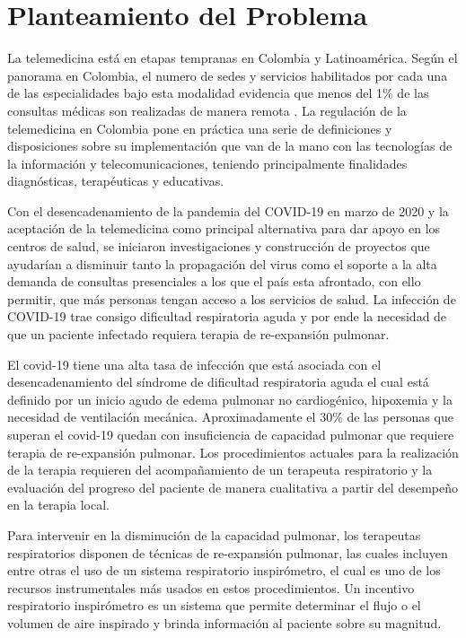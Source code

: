 
\section{Planteamiento del Problema}

La telemedicina est\'a en etapas tempranas en Colombia y Latinoam\'erica. Seg\'un el panorama en Colombia, el numero de sedes y servicios habilitados por cada una de las especialidades bajo esta modalidad evidencia que menos del 1\% de las consultas m\'edicas son realizadas de manera remota \cite{1}. La regulaci\'on de la telemedicina en Colombia pone en pr\'actica  una serie de definiciones y disposiciones sobre su implementaci\'on que van de la mano con las tecnolog\'ias de la informaci\'on y telecomunicaciones, teniendo principalmente finalidades diagn\'osticas, terap\'euticas y educativas\cite{2}.

Con el desencadenamiento de la pandemia del COVID-19 en marzo de 2020 y la aceptaci\'on de la telemedicina como principal alternativa para dar apoyo en los centros de salud, se iniciaron investigaciones y construcci\'on de proyectos que ayudar\'ian a disminuir tanto la propagaci\'on del virus como el soporte a la alta demanda de consultas presenciales a los que el pa\'is esta afrontado, con ello permitir, que m\'as personas tengan acceso a los servicios de salud. La infecci\'on de COVID-19 trae consigo dificultad respiratoria aguda y por ende la necesidad de que un paciente infectado requiera terapia de re-expansi\'on pulmonar. %

El covid-19 tiene una alta tasa de infecci\'on que est\'a asociada con el desencadenamiento del s\'indrome de dificultad respiratoria aguda el cual est\'a definido por un inicio agudo de edema pulmonar no cardiog\'enico, hipoxemia y la necesidad de ventilaci\'on mec\'anica\cite{8}. Aproximadamente el 30\% de las personas que superan el covid-19 quedan con insuficiencia de capacidad pulmonar que requiere terapia de re-expansi\'on pulmonar\cite{9}.  Los procedimientos actuales para la realizaci\'on de la terapia requieren del acompa\~{n}amiento de un terapeuta respiratorio y la evaluaci\'on del progreso del paciente de manera cualitativa a partir del desempe\~{n}o en la terapia local. 

Para intervenir en la disminuci\'on de la capacidad pulmonar, los terapeutas respiratorios disponen de t\'ecnicas de re-expansi\'on pulmonar, las cuales incluyen entre otras el uso de un sistema respiratorio inspir\'ometro, el cual es uno de los recursos instrumentales m\'as usados en estos procedimientos. Un incentivo respiratorio inspir\'ometro  es un sistema que permite determinar el flujo o el volumen de aire inspirado y brinda informaci\'on al paciente sobre su magnitud. \cite{10}\cite{11} 

